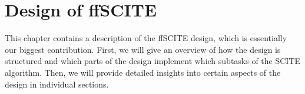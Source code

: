 \chapter{Design of ffSCITE}

This chapter contains a description of the \ac{ffSCITE} design, which is essentially our biggest contribution. First, we will give an overview of how the design is structured and which parts of the design implement which subtasks of the \ac{SCITE} algorithm. Then, we will provide detailed insights into certain aspects of the design in individual sections.






